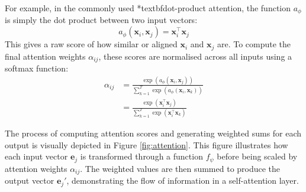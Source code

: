 For example, in the commonly used *textbf{dot-product attention}, the function \( a_\phi \) is simply the dot product between two input vectors:
\[
    a_\phi(\bm{x}_i, \bm{x}_j) = \bm{x}_i^\top \bm{x}_j
\]
This gives a raw score of how similar or aligned \( \bm{x}_i \) and \( \bm{x}_j \) are. To compute the final attention weights \( \alpha_{ij} \), these scores are normalised across all inputs using a softmax function:
\begin{align*}
    \alpha_{ij} & = \frac{\exp(a_\phi(\bm{x}_i, \bm{x}_j))}{\sum_{k=1}^{T} \exp(a_\phi(\bm{x}_i, \bm{x}_k))}                     \\
                & = \frac{\exp \left( \bm{x}_i^\top \bm{x}_j \right)}{\sum_{k=1}^{T} \exp \left( \bm{x}_i^\top \bm{x}_k \right)}
\end{align*}

The process of computing attention scores and generating weighted sums for each output is visually depicted in Figure \ref{fig:attention}. This figure illustrates how each input vector \( \bm{e}_j \) is transformed through a function \( f_\psi \) before being scaled by attention weights \( \alpha_{ij} \). The weighted values are then summed to produce the output vector \( \bm{e}_j' \), demonstrating the flow of information in a self-attention layer.

